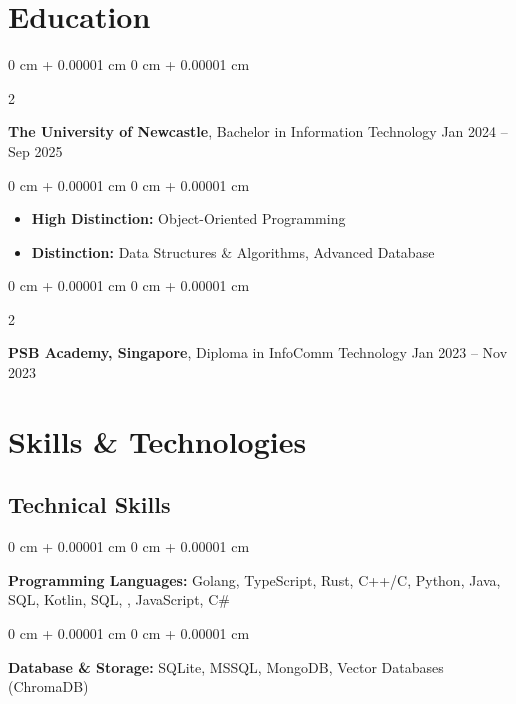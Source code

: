 \documentclass[10pt, letterpaper]{article}
\newenvironment{highlights}{
    \begin{itemize}[
        topsep=0.10 cm,
        parsep=0.10 cm,
        partopsep=0pt,
        itemsep=0pt,
        leftmargin=0 cm + 10pt
    ]
}{
    \end{itemize}
} %
\newenvironment{onecolentry}{
    \begin{adjustwidth}{
        0 cm + 0.00001 cm
    }{
        0 cm + 0.00001 cm
    }
}{
    \end{adjustwidth}
} %
\newenvironment{twocolentry}[2][]{
    \onecolentry
    \def\secondColumn{#2}
    \setcolumnwidth{\fill, 4.5 cm}
    \begin{paracol}{2}
}{
    \switchcolumn \raggedleft \secondColumn
    \end{paracol}
    \endonecolentry
} %
\begin{document}
    \section{Education}
        \begin{twocolentry}{
            Jan 2024 – Sep 2025
        }
        \textbf{The University of Newcastle}, Bachelor in Information Technology\end{twocolentry}
        \vspace{0.10 cm}
        \begin{onecolentry}
            \begin{highlights}
                \item \textbf{High Distinction:} Object-Oriented Programming
            \end{highlights}
            \begin{highlights}
                \item \textbf{Distinction:} Data Structures \& Algorithms, Advanced Database
            \end{highlights}
        \end{onecolentry}

        \vspace{0.20 cm}
        \begin{twocolentry}{
                Jan 2023 – Nov 2023
            }
            \textbf{PSB Academy, Singapore}, Diploma in InfoComm Technology\end{twocolentry}


\section{Skills \& Technologies}

\subsection*{Technical Skills}
\begin{onecolentry}
    \textbf{Programming Languages:} Golang, TypeScript, Rust, C++/C, Python, Java, SQL, Kotlin, SQL, , JavaScript, C\# 
\end{onecolentry}

\vspace{0.1 cm}

\begin{onecolentry}
    \textbf{Database \& Storage:} SQLite, MSSQL, MongoDB, Vector Databases (ChromaDB)
\end{onecolentry}
\end{document}
